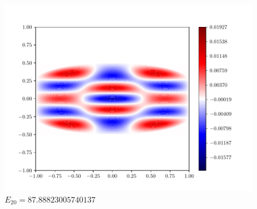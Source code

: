 \documentclass{article}
\begin{document}
\begin{enumerate}[1.]
\begin{enumerate}[(A)]
\begin{enumerate}[(i)]
\begin{figure}[H]
\begin{minipage}{0.3\linewidth}
          \includegraphics[width=\linewidth]{q6c-20.pdf}
          \caption*{$E_{20}= 87.88823005740137$}
        \end{minipage}


\end{figure}
\end{enumerate}
\end{enumerate}
\end{enumerate}
\end{document}
